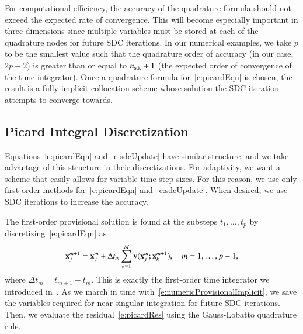 For computational efficiency, the accuracy of the quadrature formula
should not exceed the expected rate of convergence.  This will become
especially important in three dimensions since multiple variables must
be stored at each of the quadrature nodes for future SDC iterations.
In our numerical examples, we take $p$ to be the smallest value such
that the quadrature order of accuracy (in our case, $2p-2$) is greater
than or equal to $n_{{\mathrm{sdc}}}+1$ (the expected order of convergence of the
time integrator).  Once a quadrature formula for~\eqref{e:picardEqn} is
chosen, the result is a fully-implicit collocation scheme whose
solution the SDC iteration attempts to converge towards.

\subsection{Picard Integral Discretization}
\label{s:vesiclePicard}

Equations~\eqref{e:picardEqn} and~\eqref{e:sdcUpdate} have similar
structure, and we take advantage of this structure in their
discretizations.  For adaptivity, we want a scheme that easily allows
for variable time step sizes.  For this reason, we use only first-order
methods for~\eqref{e:picardEqn} and~\eqref{e:sdcUpdate}.  When desired,
we use SDC iterations to increase the accuracy.

The first-order provisional solution is found at the substeps
$t_{1},\ldots,t_{p}$ by discretizing~\eqref{e:picardEqn} as
\begin{align}
  {\mathbf{x}}_{j}^{m+1} = {\mathbf{x}}_{j}^{m} + \Delta t_{m}
    \sum_{k=1}^{M} {\mathbf{v}}({\mathbf{x}}_{j}^{m};{\mathbf{x}}_{k}^{m+1}), \quad
    m=1,\ldots,p-1,
  \label{e:numericProvisionalImplicit}
\end{align}
where $\Delta t_{m} = t_{m+1} - t_{m}$.  This is exactly the first-order
time integrator we introduced in~\cite{qua:bir2014b}.  As we march in
time with~\eqref{e:numericProvisionalImplicit}, we save the variables
required for near-singular integration for future SDC iterations.  Then,
we evaluate the residual~\eqref{e:picardRes} using the Gauss-Lobatto
quadrature rule.

